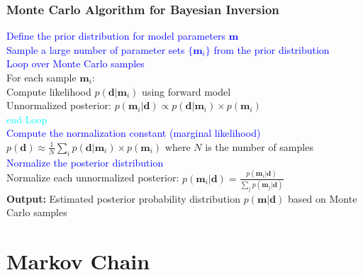 \documentclass[aspectratio=169]{beamer}
\begin{document}
\begin{frame}
\frametitle{\textbf{Monte Carlo Algorithm for Bayesian Inversion}}
\footnotesize
\textcolor{blue}{Define the prior distribution for model parameters $\mathbf{m}$} \\
\textcolor{blue}{Sample a large number of parameter sets $\{\mathbf{m}_i\}$ from the prior distribution} \\
\textcolor{blue}{Loop over Monte Carlo samples} \\
\hspace{1cm} For each sample $\mathbf{m}_i$: \\
\hspace{1cm} Compute likelihood \( p(\mathbf{d}|\mathbf{m}_i) \) using forward model \vspace{0.1cm} \\
\hspace{1cm} Unnormalized posterior: \( p(\mathbf{m}_i|\mathbf{d}) \propto p(\mathbf{d}|\mathbf{m}_i) \times p(\mathbf{m}_i) \) \vspace{0.1cm} \\
\textcolor{cyan}{end Loop} \\
\textcolor{blue}{Compute the normalization constant (marginal likelihood)} \\
\hspace{1cm} \( p(\mathbf{d}) \approx \frac{1}{N} \sum_i p(\mathbf{d}|\mathbf{m}_i) \times p(\mathbf{m}_i) \) where $N$ is the number of samples \vspace{0.1cm} \\
\textcolor{blue}{Normalize the posterior distribution} \\
\hspace{1cm} Normalize each unnormalized posterior: \( p(\mathbf{m}_i|\mathbf{d}) = \frac{p(\mathbf{m}_i|\mathbf{d})}{\sum_j p(\mathbf{m}_j|\mathbf{d})} \) \vspace{0.1cm} \\
\textbf{Output:} Estimated posterior probability distribution \( p(\mathbf{m}|\mathbf{d}) \) based on Monte Carlo samples\\
\end{frame}




\section{Markov Chain}
\subsection{}
\end{document}
